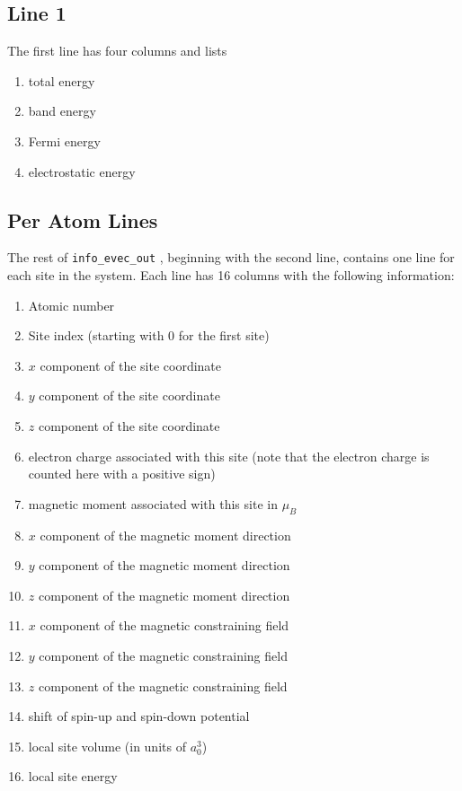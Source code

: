 \subsection{Line 1}
The first line has four columns and lists
\begin{enumerate}
\item total energy
\item band energy
\item Fermi energy
\item electrostatic energy
\end{enumerate}
\subsection{Per Atom Lines}
The rest of \texttt{info\_evec\_out} , beginning with the second line, contains one line for each site in the system.
Each line has 16 columns with the following information:
\begin{enumerate}
\item Atomic number
\item Site index (starting with 0 for the first site)
\item $x$ component of the site coordinate
\item $y$ component of the site coordinate
\item $z$ component of the site coordinate
\item electron charge associated with this site (note that the electron charge is counted here with a positive sign)
\item magnetic moment associated with this site in $\mu_B$
\item $x$ component of the magnetic moment direction
\item $y$ component of the magnetic moment direction
\item $z$ component of the magnetic moment direction
\item $x$ component of the magnetic constraining field
\item $y$ component of the magnetic constraining field
\item $z$ component of the magnetic constraining field
\item shift of spin-up and spin-down potential
\item local site volume (in units of $a_0^3$)
\item local site energy
\end{enumerate}


